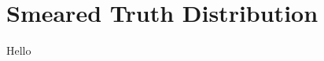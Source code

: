 
\chapter{Smeared Truth Distribution} 
\label{appendix_smeared}
\ifpdf
    \graphicspath{{Appendix6/Figs/Raster/}{Appendix6/Figs/PDF/}{Appendix6/Figs/}}
\else
    \graphicspath{{Appendix6/Figs/Vector/}{Appendix6/Figs/}}
\fi

Hello
